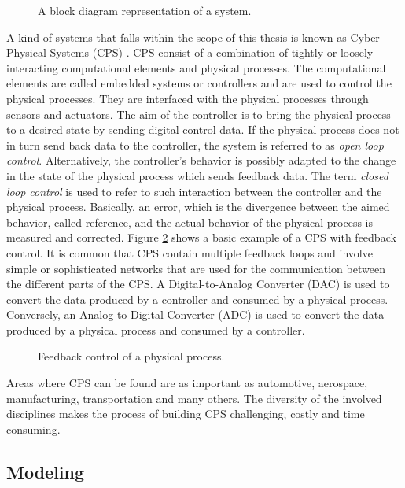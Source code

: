 \begin{figure}[phbt]
\centering

\caption{A block diagram representation of a system.}
\label{fig:system}
\end{figure}

A kind of systems that falls within the scope of this thesis is known as Cyber-Physical Systems (CPS) \cite{lee:2016}. CPS consist of a combination of tightly or loosely interacting computational elements and physical processes. The computational elements are called embedded systems or controllers and are used to control the physical processes. They are interfaced with the physical processes through sensors and actuators. The aim of the controller is to bring the physical process to a desired state by sending digital control data. If the physical process does not in turn send back data to the controller, the system is referred to as \textit{open loop control}. Alternatively, the controller's behavior is possibly adapted to the change in the state of the physical process which sends feedback data. The term \textit{closed loop control} is used to refer to such interaction between the controller and the physical process. Basically, an error, which is the divergence between the aimed behavior, called reference, and the actual behavior of the physical process is measured and corrected. Figure \ref{fig:feedb} shows a basic example of a CPS with feedback control. It is common that CPS contain multiple feedback loops and involve simple or sophisticated networks that are used for the communication between the different parts of the CPS. A Digital-to-Analog Converter (DAC) is used to convert the data produced by a controller and consumed by a physical process. Conversely, an Analog-to-Digital Converter (ADC) is used to convert the data produced by a physical process and consumed by a controller. 

\begin{figure}[phbt]
\centering

\caption{Feedback control of a physical process.}
\label{fig:feedb}
\end{figure}  

Areas where CPS can be found are as important as automotive, aerospace, manufacturing, transportation and many others. The diversity of the involved disciplines makes the process of building CPS challenging, costly and time consuming.

\subsection{Modeling}

